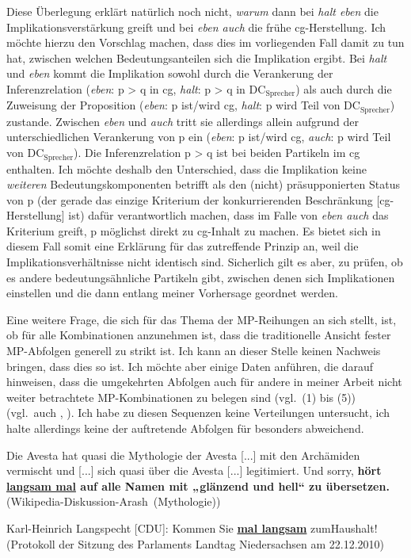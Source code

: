 Diese Überlegung erklärt natürlich noch nicht, \emph{warum} dann bei \textit{halt eben} die Implikationsverstärkung greift und bei \textit{eben auch} die frühe cg-Herstellung. Ich möchte hierzu den Vorschlag machen, dass dies im vorliegenden Fall damit zu tun hat, zwischen welchen Bedeutungsanteilen sich die Implikation ergibt. Bei \textit{halt} und \textit{eben} kommt die Implikation sowohl durch die Verankerung der Infe\-renzrelation (\textit{eben}: p > q in cg, \textit{halt}: p > q in DC$_{\textrm{Sprecher}}$) als auch durch die Zuweisung der Proposition (\textit{eben}: p ist/wird cg, \textit{halt}: p wird Teil von DC$_{\textrm{Sprecher}}$) zustande. Zwischen \textit{eben} und \textit{auch} tritt sie allerdings allein aufgrund der unterschiedlichen Verankerung von p ein (\textit{eben}: p ist/wird cg, \textit{auch}: p wird Teil von DC$_{\textrm{Sprecher}}$). Die Inferenzrelation p > q ist bei beiden Partikeln im cg enthalten. Ich möchte deshalb den Unterschied, dass die Implikation keine \emph{weiteren} Bedeutungskomponenten betrifft als den (nicht) präsupponierten Status von p (der gerade das einzige Kriterium der konkurrierenden Beschränkung [cg-Herstellung] ist) dafür verantwortlich machen, dass im Falle von \textit{eben auch} das Kriterium greift, p möglichst direkt zu cg-Inhalt zu machen. Es bietet sich in diesem Fall somit eine Erklärung für das zutreffende Prinzip an, weil die Implikationsverhältnisse nicht identisch sind. Sicherlich gilt es aber, zu prüfen, ob es andere bedeutungsähnliche Partikeln gibt, zwischen denen sich Implikationen einstellen und die dann entlang meiner Vorhersage geordnet werden.

Eine weitere Frage, die sich für das Thema der MP-Reihungen an sich stellt, ist, ob für alle Kombinationen anzunehmen ist, dass die traditionelle Ansicht fester MP-Abfolgen generell zu strikt ist. Ich kann an dieser Stelle keinen Nachweis bringen, dass dies so ist. Ich möchte aber einige Daten anführen, die darauf hinweisen, dass die umgekehrten Abfolgen auch für andere in meiner Arbeit nicht weiter betrachtete MP-Kom\-bi\-na\-ti\-on\-en zu belegen sind (vgl.\ (1) bis (5)) (vgl.\ auch \citealt[251--252]{Mueller2017a}, \citeyear[237]{Mueller2017b}). Ich habe zu diesen Sequenzen keine Verteilungen untersucht, ich halte allerdings keine der auftretende Abfolgen für besonders abweichend.

\begin{exe}
	\ex\label{1196}
		\begin{xlist}	
			\ex\label{1196a}
		 
			{Die Avesta hat quasi die Mythologie der Avesta [...] mit den Archämiden vermischt und [...] sich quasi über die Avesta 			$				[$...] legitimiert. Und sorry, \textbf{hört \underline{langsam mal} auf alle Namen mit „glänzend und hell“ zu übersetzen.}
			\hfill\hbox{(Wikipedia-Diskussion-Arash (Mythologie))}}		
			\ex\label{1196b} 
		
			{Karl-Heinrich Langspecht [CDU]: Kommen Sie \underline{\textbf{mal langsam}} zum\linebreak Haushalt!}
			\hfill({\scriptsize Protokoll der Sitzung des Parlaments Landtag Niedersachsen am 22.12.2010})
		\end{xlist}
\end{exe}

